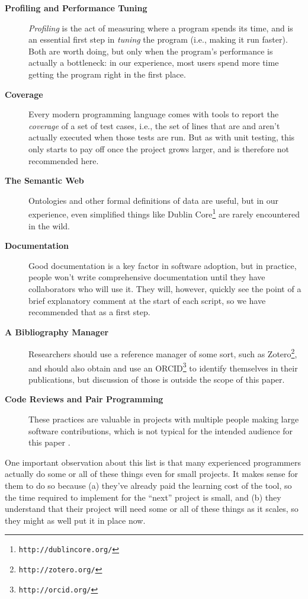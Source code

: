 \documentclass[10pt,letterpaper]{article}
\newcommand{\withurl}[2]{{#1}\footnote{{\texttt{#2}}}}
\begin{document}
\begin{description}
\item[\textbf{Profiling and Performance Tuning}] \emph{Profiling} is
  the act of measuring where a program spends its time, and is an
  essential first step in \emph{tuning} the program (i.e., making it
  run faster). Both are worth doing, but only when the program's
  performance is actually a bottleneck: in our experience, most users
  spend more time getting the program right in the first place.

\item[\textbf{Coverage}] Every modern programming language comes with
  tools to report the \emph{coverage} of a set of test cases, i.e.,
  the set of lines that are and aren't actually executed when those
  tests are run. But as with unit testing, this
  only starts to pay off once the project grows larger, and is
  therefore not recommended here.

\item[\textbf{The Semantic Web}] Ontologies and other formal
  definitions of data are useful, but in our experience, even
  simplified things like \withurl{Dublin Core}{http://dublincore.org/}
  are rarely encountered in the wild.

\item[\textbf{Documentation}] Good documentation is a key factor in
  software adoption, but in practice, people won't write comprehensive
  documentation until they have collaborators who will use it. They
  will, however, quickly see the point of a brief explanatory comment
  at the start of each script, so we have recommended that as a first
  step.

\item[\textbf{A Bibliography Manager}] Researchers should use a
  reference manager of some sort, such as
  \withurl{Zotero}{http://zotero.org/}, and should also obtain and use
  an \withurl{ORCID}{http://orcid.org/} to identify themselves in
  their publications, but discussion of those is outside the scope of
  this paper.

\item[\textbf{Code Reviews and Pair Programming}] These practices are
  valuable in projects with multiple people making large software
  contributions, which is not typical for the intended audience for this paper \cite{petre2014}.

\end{description}

One important observation about this list is that many experienced
programmers actually do some or all of these things even for small
projects. It makes sense for them to do so because (a) they've already
paid the learning cost of the tool, so the time required to implement
for the ``next'' project is small, and (b) they understand that their
project will need some or all of these things as it scales, so they
might as well put it in place now.
\end{document}
